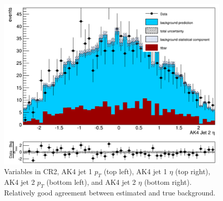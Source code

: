 \begin{figure}[thb!]
\begin{center}
\includegraphics[scale=0.25]{Figures/AK42etaCR2.pdf}
\end{center}
\caption{Variables in CR2, AK4 jet 1 $p_{T}$ (top left), AK4 jet 1 $\eta$ (top right), AK4 jet 2 $p_{T}$ (bottom left), and AK4 jet 2 $\eta$ (bottom right). Relatively good agreement between estimated and true background.}
\label{fig:CR2b}
\end{figure}

